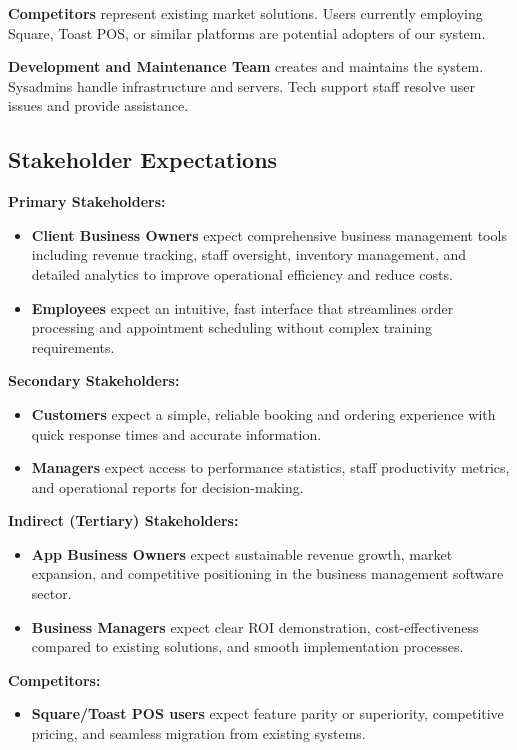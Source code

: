 \documentclass[]{VUMIFTemplateClass}
\begin{document}
\textbf{Competitors} represent existing market solutions. Users currently
employing Square, Toast POS, or similar platforms are potential adopters of our
system.

\textbf{Development and Maintenance Team} creates and maintains the system.
Sysadmins handle infrastructure and servers. Tech support staff resolve user
issues and provide assistance.

\subsection{Stakeholder Expectations}

\textbf{Primary Stakeholders:}
\begin{itemize}
    \item \textbf{Client Business Owners} expect comprehensive business management tools including revenue tracking, staff oversight, inventory management, and detailed analytics to improve operational efficiency and reduce costs.
    \item \textbf{Employees} expect an intuitive, fast interface that streamlines order processing and appointment scheduling without complex training requirements.
\end{itemize}

\textbf{Secondary Stakeholders:}
\begin{itemize}
    \item \textbf{Customers} expect a simple, reliable booking and ordering experience with quick response times and accurate information.
    \item \textbf{Managers} expect access to performance statistics, staff productivity metrics, and operational reports for decision-making.
\end{itemize}

\textbf{Indirect (Tertiary) Stakeholders:}
\begin{itemize}
    \item \textbf{App Business Owners} expect sustainable revenue growth, market expansion, and competitive positioning in the business management software sector.
    \item \textbf{Business Managers} expect clear ROI demonstration, cost-effectiveness compared to existing solutions, and smooth implementation processes.
\end{itemize}

\textbf{Competitors:}
\begin{itemize}
    \item \textbf{Square/Toast POS users} expect feature parity or superiority, competitive pricing, and seamless migration from existing systems.
\end{itemize}
\end{document}

